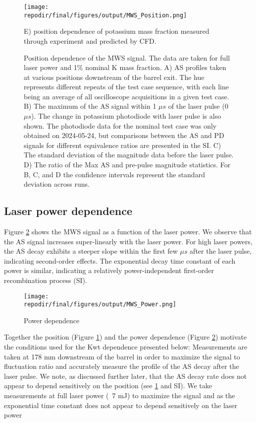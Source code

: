 \begin{figure}[h]
    \texttt{[image: \\repodir/final/figures/output/MWS\_Position.png]} 
    \caption{Position dependence of the MWS signal. The data are taken for full laser power and 1\% nominal K mass fraction. A) AS profiles taken at various positions downstream of the barrel exit. The hue represents different repeats of the test case sequence, with each line being an average of all oscilloscope acquisitions in a given test case. B) The maximum of the AS signal within 1 $\mu s$ of the laser pulse (0 $\mu s$). The change in potassium photodiode with laser pulse is also shown. The photodiode data for the nominal test case was only obtained on 2024-05-24, but comparisons between the AS and PD signals for different equivalence ratios are presented in the SI.   C) The standard deviation of the magnitude data before the laser pulse. D) The ratio of the Max AS and pre-pulse magnitude statistics. For B, C, and D the confidence intervals represent the standard deviation across runs. } E) position dependence of potassium mass fraction measured through experiment and predicted by CFD. 
    \label{fig:pos_dependence}
\end{figure}

\subsection{Laser power dependence}

Figure \ref{fig:power_dependence} shows the MWS signal as a function of the laser power. We observe that the AS signal increases super-linearly with the laser power. For high laser powers, the AS decay exhibits a steeper slope within the first few $\mu s$ after the laser pulse, indicating second-order effects. The exponential decay time constant of each power is similar, indicating a relatively power-independent first-order recombination process (SI).

\begin{figure}[h]
    \texttt{[image: \\repodir/final/figures/output/MWS\_Power.png]} 
    \caption{Power dependence}
    \label{fig:power_dependence}
\end{figure}

Together the position (Figure \ref{fig:pos_dependence}) and the power dependence (Figure \ref{fig:power_dependence}) motivate the conditions used for the Kwt dependence presented below: Measurements are taken at 178 mm downstream of the barrel in order to maximize the signal to fluctuation ratio and accurately measure the profile of the AS decay after the laser pulse. We note, as discussed further later, that the AS decay rate does not appear to depend sensitively on the position (see \ref{fig:pos_dependence} and SI). We take measurements at full laser power (~7 mJ) to maximize the signal and as the exponential time constant does not appear to depend sensitively on the laser power


